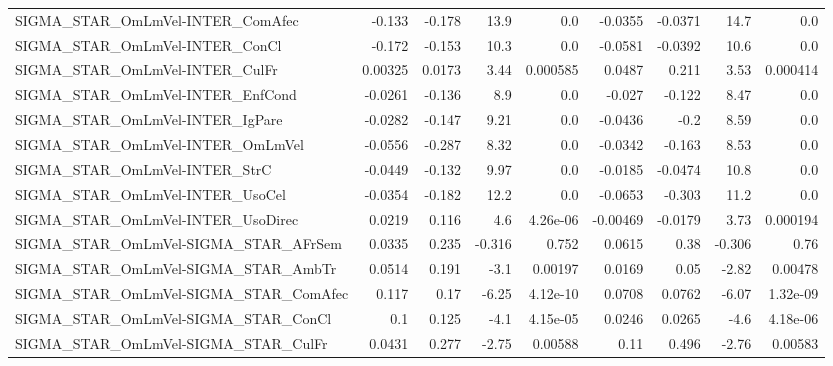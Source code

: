 \begin{tabular}{lrrrrrrrr}
SIGMA\_STAR\_OmLmVel-INTER\_ComAfec       &      -0.133 &       -0.178 &     13.9 &      0.0 &    -0.0355 &     -0.0371 &         14.7 &           0.0 \\
SIGMA\_STAR\_OmLmVel-INTER\_ConCl         &      -0.172 &       -0.153 &     10.3 &      0.0 &    -0.0581 &     -0.0392 &         10.6 &           0.0 \\
SIGMA\_STAR\_OmLmVel-INTER\_CulFr         &     0.00325 &       0.0173 &     3.44 & 0.000585 &     0.0487 &       0.211 &         3.53 &      0.000414 \\
SIGMA\_STAR\_OmLmVel-INTER\_EnfCond       &     -0.0261 &       -0.136 &      8.9 &      0.0 &     -0.027 &      -0.122 &         8.47 &           0.0 \\
SIGMA\_STAR\_OmLmVel-INTER\_IgPare        &     -0.0282 &       -0.147 &     9.21 &      0.0 &    -0.0436 &        -0.2 &         8.59 &           0.0 \\
SIGMA\_STAR\_OmLmVel-INTER\_OmLmVel       &     -0.0556 &       -0.287 &     8.32 &      0.0 &    -0.0342 &      -0.163 &         8.53 &           0.0 \\
SIGMA\_STAR\_OmLmVel-INTER\_StrC          &     -0.0449 &       -0.132 &     9.97 &      0.0 &    -0.0185 &     -0.0474 &         10.8 &           0.0 \\
SIGMA\_STAR\_OmLmVel-INTER\_UsoCel        &     -0.0354 &       -0.182 &     12.2 &      0.0 &    -0.0653 &      -0.303 &         11.2 &           0.0 \\
SIGMA\_STAR\_OmLmVel-INTER\_UsoDirec      &      0.0219 &        0.116 &      4.6 & 4.26e-06 &   -0.00469 &     -0.0179 &         3.73 &      0.000194 \\
SIGMA\_STAR\_OmLmVel-SIGMA\_STAR\_AFrSem   &      0.0335 &        0.235 &   -0.316 &    0.752 &     0.0615 &        0.38 &       -0.306 &          0.76 \\
SIGMA\_STAR\_OmLmVel-SIGMA\_STAR\_AmbTr    &      0.0514 &        0.191 &     -3.1 &  0.00197 &     0.0169 &        0.05 &        -2.82 &       0.00478 \\
SIGMA\_STAR\_OmLmVel-SIGMA\_STAR\_ComAfec  &       0.117 &         0.17 &    -6.25 & 4.12e-10 &     0.0708 &      0.0762 &        -6.07 &      1.32e-09 \\
SIGMA\_STAR\_OmLmVel-SIGMA\_STAR\_ConCl    &         0.1 &        0.125 &     -4.1 & 4.15e-05 &     0.0246 &      0.0265 &         -4.6 &      4.18e-06 \\
SIGMA\_STAR\_OmLmVel-SIGMA\_STAR\_CulFr    &      0.0431 &        0.277 &    -2.75 &  0.00588 &       0.11 &       0.496 &        -2.76 &       0.00583 \\

\end{tabular}
